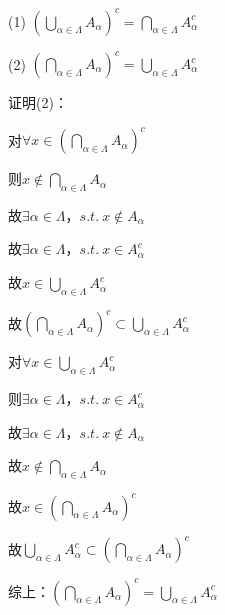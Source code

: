 \newpage
\begin{td}
\par (1) $\left( \bigcup \limits_{\alpha \in \varLambda}A_{\alpha}\right)^{c} = \bigcap \limits_{\alpha \in \varLambda}A_{\alpha}^{c}$
\par (2) $\left( \bigcap \limits_{\alpha \in \varLambda}A_{\alpha}\right)^{c} = \bigcup \limits_{\alpha \in \varLambda}A_{\alpha}^{c}$
\end{td}
\noindent 证明(2)：
\par {} 对$\forall x \in \left( \bigcap \limits_{\alpha \in \varLambda}A_{\alpha}\right)^{c} $
\par \quad 则$x \notin \bigcap \limits_{\alpha \in \varLambda}A_{\alpha}$
\par \quad 故$\exists \alpha \in \varLambda $，$s.t. \ x \notin A_{\alpha}$
\par \quad 故$\exists \alpha \in \varLambda $，$s.t. \ x \in A_{\alpha}^{c}$
\par \quad 故$x \in \bigcup \limits_{\alpha \in \varLambda}A_{\alpha}^{c}$
\par \quad 故$\left( \bigcap \limits_{\alpha \in \varLambda}A_{\alpha}\right)^{c} \subset  \bigcup \limits_{\alpha \in \varLambda}A_{\alpha}^{c}$
\par {} 对$\forall x \in \bigcup \limits_{\alpha \in \varLambda}A_{\alpha}^{c}$
\par \quad 则$\exists \alpha \in \varLambda $，$s.t. \ x \in A_{\alpha}^{c}$
\par \quad 故$\exists \alpha \in \varLambda $，$s.t. \ x \notin A_{\alpha}$
\par \quad 故$x \notin \bigcap \limits_{\alpha \in \varLambda}A_{\alpha}$
\par \quad 故$x \in \left( \bigcap \limits_{\alpha \in \varLambda}A_{\alpha}\right)^{c}$
\par \quad 故$\bigcup \limits_{\alpha \in \varLambda}A_{\alpha}^{c} \subset \left( \bigcap \limits_{\alpha \in \varLambda}A_{\alpha}\right)^{c} $
\par 综上：$\left( \bigcap \limits_{\alpha \in \varLambda}A_{\alpha}\right)^{c} = \bigcup \limits_{\alpha \in \varLambda}A_{\alpha}^{c}$
\\ \hspace*{\fill}\\

